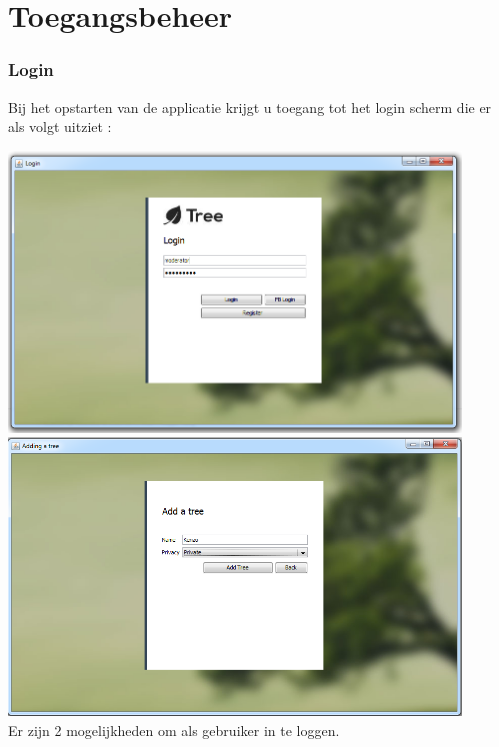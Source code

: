 \documentclass[pdftex,a4paper,12pt,twoside]{report}
\begin{document}
\chapter{Toegangsbeheer}\label{ch:preface}
\subsection{Login}
Bij het opstarten van de applicatie krijgt u toegang tot het login scherm die er als volgt uitziet :

\includegraphics[width=12cm]{images/login.png}\\[.5cm]

\includegraphics[width=12cm]{images/add_tree.png}\\[.5cm]
Er zijn 2 mogelijkheden om als gebruiker in te loggen.
\end{document}
